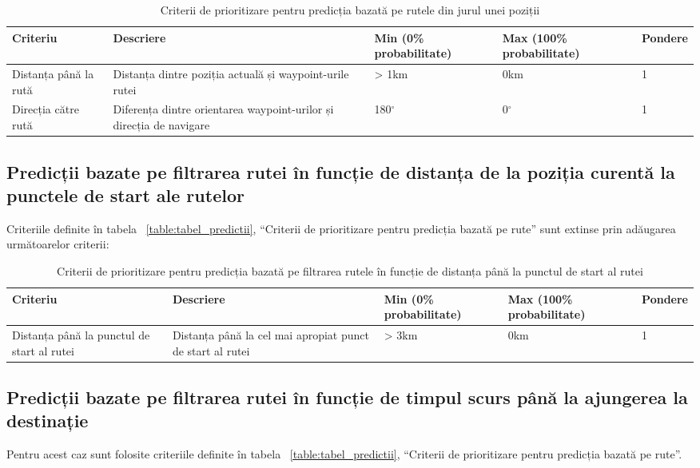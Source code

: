 		\begin{table}[!h]
		\caption{Criterii de prioritizare pentru predicția bazată pe rutele din jurul unei poziții}
		\centering
		\begin{tabular}{ | m{} | m{} | m{3,22cm} | m{} | m{} | }
		\hline
		\textbf{Criteriu} & \textbf{Descriere} & \textbf{Min (0\% probabilitate)} & \textbf{Max (100\% probabilitate)} & \textbf{Pondere} \\ 
		\hline
		 Distanța până la rută & Distanța dintre poziția actuală și waypoint-urile rutei &> 1km & 0km & 1 \\
		\hline
		 Direcția către rută & Diferența dintre orientarea waypoint-urilor și direcția de navigare & 180$^{\circ}$ & 0$^{\circ}$ & 1 \\
		\hline
		\end{tabular}
		\end{table}
		
		
		\subsection{Predicții bazate pe filtrarea rutei în funcție de distanța de la poziția curentă la punctele de start ale rutelor}
		Criteriile definite în tabela ~\ref{table:tabel_predictii}, ``Criterii de prioritizare pentru predicția bazată pe rute'' sunt extinse prin adăugarea următoarelor criterii:
		
		\begin{table}[!h]
		\caption{Criterii de prioritizare pentru predicția bazată pe filtrarea rutele în funcție de distanța până la punctul de start al rutei}
		\centering
		\begin{tabular}{ | m{} | m{} | m{3,22cm} | m{} | m{} | }
		\hline
		\textbf{Criteriu} & \textbf{Descriere} & \textbf{Min (0\% probabilitate)} & \textbf{Max (100\% probabilitate)} & \textbf{Pondere} \\ 
		\hline
		 Distanța până la punctul de start al rutei & Distanța până la cel mai apropiat punct de start al rutei &> 3km & 0km & 1 \\
		\hline
		\end{tabular}
		\end{table}
		
		\subsection{Predicții bazate pe filtrarea rutei în funcție de timpul scurs până la ajungerea la destinație}
		Pentru acest caz sunt folosite criteriile definite în tabela ~\ref{table:tabel_predictii}, ``Criterii de prioritizare pentru predicția bazată pe rute''.
		
		
		
		


	